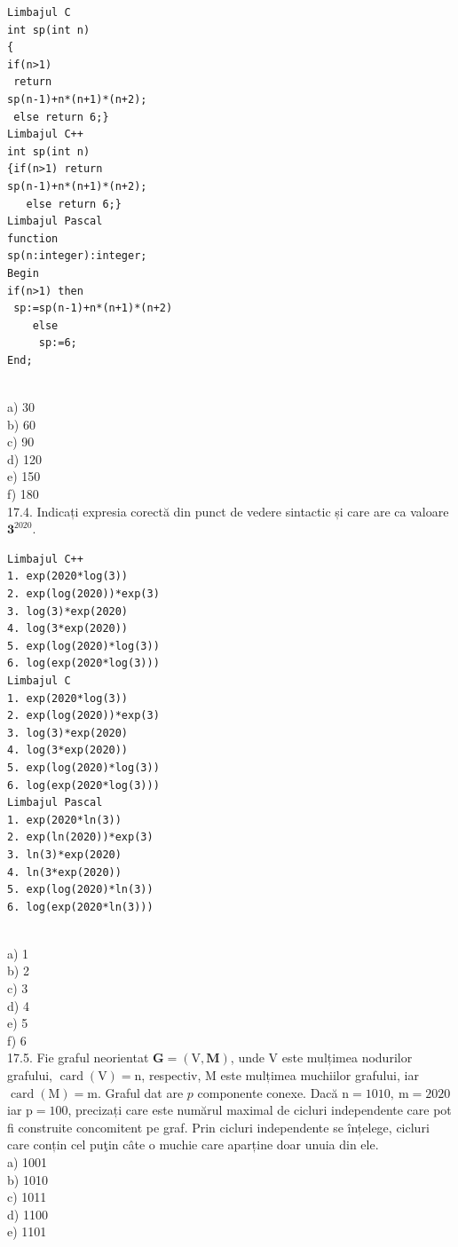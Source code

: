{{\begin{verbatim}
Limbajul C 
int sp(int n) 
{ 
if(n>1)  
 return  
sp(n-1)+n*(n+1)*(n+2); 
 else return 6;}
Limbajul C++ 
int sp(int n) 
{if(n>1) return  
sp(n-1)+n*(n+1)*(n+2); 
   else return 6;}
Limbajul Pascal 
function 
sp(n:integer):integer; 
Begin 
if(n>1) then  
 sp:=sp(n-1)+n*(n+1)*(n+2) 
    else  
     sp:=6; 
End;
\end{verbatim}
\\
a) 30
\\
b) 60
\\
c) 90
\\
d) 120
\\
e) 150
\\
f) 180
\\
17.4. Indicați expresia corectă din punct de vedere sintactic și care are ca valoare $\mathbf{3}^{2020}$.
\begin{verbatim}
Limbajul C++ 
1. exp(2020*log(3)) 
2. exp(log(2020))*exp(3) 
3. log(3)*exp(2020) 
4. log(3*exp(2020)) 
5. exp(log(2020)*log(3)) 
6. log(exp(2020*log(3)))
Limbajul C 
1. exp(2020*log(3)) 
2. exp(log(2020))*exp(3) 
3. log(3)*exp(2020)  
4. log(3*exp(2020)) 
5. exp(log(2020)*log(3)) 
6. log(exp(2020*log(3)))
Limbajul Pascal 
1. exp(2020*ln(3)) 
2. exp(ln(2020))*exp(3) 
3. ln(3)*exp(2020) 
4. ln(3*exp(2020)) 
5. exp(log(2020)*ln(3)) 
6. log(exp(2020*ln(3))) 
\end{verbatim}
\\
a) 1
\\
b) 2
\\
c) 3
\\
d) 4
\\
e) 5
\\
f) 6
\\
17.5. Fie graful neorientat $\mathbf{G}=(\mathrm{V}, \mathbf{M})$, unde V este mulțimea nodurilor grafului, $\operatorname{card}(\mathrm{V})=\mathrm{n}$, respectiv, M este mulțimea muchiilor grafului, iar $\operatorname{card}(\mathrm{M})=\mathrm{m}$. Graful dat are $p$ componente conexe. Dacă $\mathrm{n}=1010, \mathrm{~m}=2020$ iar $\mathrm{p}=100$, precizați care este numărul maximal de cicluri independente care pot fi construite concomitent pe graf. Prin cicluri independente se înțelege, cicluri care conțin cel puţin câte o muchie care aparține doar unuia din ele.
\\
a) 1001
\\
b) 1010
\\
c) 1011
\\
d) 1100
\\
e) 1101
\\
}}
